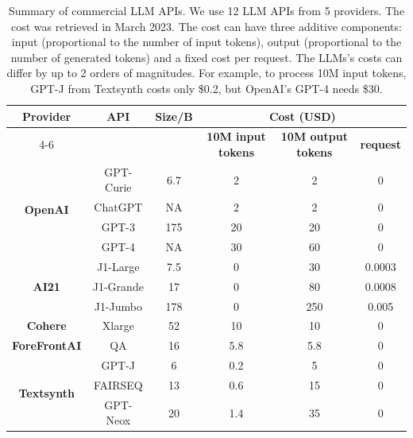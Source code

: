 \documentclass{article}
\numberwithin{equation}{section}
\begin{document}
\begin{table}[htbp]
  \centering
  \small
  \caption{Summary of commercial LLM APIs. We use 12 LLM APIs from 5 providers. The cost was retrieved in March 2023. The cost can have three additive components: input (proportional to the number of input tokens), output (proportional to the number of generated tokens) and a fixed cost per request. The LLMs's costs can differ by up to 2 orders of magnitudes. For example, to process 10M input tokens, GPT-J from Textsynth costs only \$0.2, but OpenAI's GPT-4 needs \$30.}
    \begin{tabular}{|c|c|c|c|c|c|}
    \hline
    \multirow{2}[4]{*}{\textbf{Provider}} &
      \multirow{2}[4]{*}{\textbf{API}} &
      \multicolumn{1}{c|}{\multirow{2}[4]{*}{\textbf{Size/B}}} &
      \multicolumn{3}{c|}{\textbf{Cost (USD)}}
      \bigstrut\\
\cline{4-6}    \multicolumn{1}{|c|}{} &
      \multicolumn{1}{c|}{} &
       &
      \multicolumn{1}{c|}{\textbf{10M input tokens}} &
      \multicolumn{1}{c|}{\textbf{10M output tokens}} &
      \multicolumn{1}{c|}{\textbf{ request}}
      \bigstrut\\
    \hline
    \hline
    \multirow{4}[8]{*}{\textbf{OpenAI}} &
      GPT-Curie &
      6.7 &
      2 &
      2 &
      0
      \bigstrut\\
\cline{2-6}    \multicolumn{1}{|c|}{} &
      ChatGPT &
      \multicolumn{1}{c|}{NA} &
      2 &
      2 &
      0
      \bigstrut\\
\cline{2-6}    \multicolumn{1}{|c|}{} &
      GPT-3 &
      175 &
      20 &
      20 &
      0
      \bigstrut\\
\cline{2-6}    \multicolumn{1}{|c|}{} &
      GPT-4 &
      \multicolumn{1}{c|}{NA} &
      30 &
      60 &
      0
      \bigstrut\\
    \hline
    \hline
    \multirow{3}[6]{*}{\textbf{AI21}} &
      J1-Large &
      7.5 &
      0 &
      30 &
      0.0003
      \bigstrut\\
\cline{2-6}    \multicolumn{1}{|c|}{} &
      J1-Grande &
      17 &
      0 &
      80 &
      0.0008
      \bigstrut\\
\cline{2-6}    \multicolumn{1}{|c|}{} &
      J1-Jumbo &
      178 &
      0 &
      250 &
      0.005
      \bigstrut\\
    \hline
    \hline
    \textbf{Cohere} &
      Xlarge &
      52 &
      10 &
      10 &
      0
      \bigstrut\\
    \hline      
    \hline
    \textbf{ForeFrontAI} &
      QA &
      16 &
      5.8 &
      5.8 &
      0
      \bigstrut\\
    \hline      
    \hline
    \multirow{3}[6]{*}{\textbf{Textsynth}} &
      GPT-J &
      6 &
      0.2 &
      5 &
      0
      \bigstrut\\
\cline{2-6}    \multicolumn{1}{|c|}{} &
      FAIRSEQ &
      13 &
      0.6 &
      15 &
      0
      \bigstrut\\
\cline{2-6}    \multicolumn{1}{|c|}{} &
      GPT-Neox &
      20 &
      1.4 &
      35 &
      0
      \bigstrut\\
    \hline
    \end{tabular}%
  \label{tab:AML:LLMAPIs}%
\end{table}%
\end{document}
